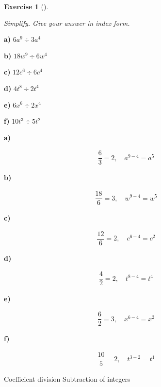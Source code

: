 \documentclass[
  letterpaper,
  DIV=11,
  numbers=noendperiod]{scrreprt}
\theoremstyle{definition}
\newtheorem{exercise}{Exercise}[chapter]
\theoremstyle{remark}
\begin{document}
\begin{exercise}[]\protect\hypertarget{exr-u2-6}{}\label{exr-u2-6}

\emph{Simplify. Give your answer in index form.}

\textbf{a)} \(\displaystyle 6a^{9} \div 3a^{4}\)

\textbf{b)} \(\displaystyle 18w^{9} \div 6w^{4}\)

\textbf{c)} \(\displaystyle 12c^{6} \div 6c^{4}\)

\textbf{d)} \(\displaystyle 4t^{8} \div 2t^{4}\)

\textbf{e)} \(\displaystyle 6x^{6} \div 2x^{4}\)

\textbf{f)} \(\displaystyle 10t^{3} \div 5t^{2}\)

\begin{tcolorbox}[enhanced jigsaw, opacitybacktitle=0.6, coltitle=black, arc=.35mm, colframe=quarto-callout-tip-color-frame, colback=white, bottomrule=.15mm, left=2mm, colbacktitle=quarto-callout-tip-color!10!white, titlerule=0mm, opacityback=0, title=\textcolor{quarto-callout-tip-color}{\faLightbulb}\hspace{0.5em}{🔍 View Solutions}, leftrule=.75mm, breakable, rightrule=.15mm, bottomtitle=1mm, toptitle=1mm, toprule=.15mm]

\textbf{a)}

\[
\begin{aligned}
\dfrac{6}{3}=2,\quad a^{9-4}=a^{5}
\end{aligned}
\]

\textbf{b)}

\[
\begin{aligned}
\dfrac{18}{6}=3,\quad w^{9-4}=w^{5}
\end{aligned}
\]

\textbf{c)}

\[
\begin{aligned}
\dfrac{12}{6}=2,\quad c^{6-4}=c^{2}
\end{aligned}
\]

\textbf{d)}

\[
\begin{aligned}
\dfrac{4}{2}=2,\quad t^{8-4}=t^{4}
\end{aligned}
\]

\textbf{e)}

\[
\begin{aligned}
\dfrac{6}{2}=3,\quad x^{6-4}=x^{2}
\end{aligned}
\]

\textbf{f)}

\[
\begin{aligned}
\dfrac{10}{5}=2,\quad t^{3-2}=t^{1}
\end{aligned}
\]

\end{tcolorbox}

{Coefficient division} {Subtraction of integers}

\end{exercise}
\end{document}
